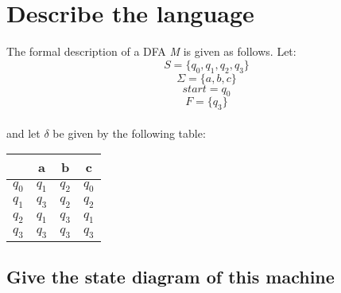 \documentclass[12pt]{article}
\begin{document}
            \pagebreak 

        \section{Describe the language}
            The formal description of a DFA \emph{M} is given as follows. 
            Let: \[S = \{q_0, q_1, q_2, q_3\}\]
                \[\Sigma = \{a, b, c\}\]
                \[start = q_0\]
                \[F= \{q_3\}\]
            \\ and let $\delta$ be given by the following table:
                \begin{center}
                    \begin{tabular}{ c |c c c}
                         & a & b & c \\ 

                        \hline

                        $q_0$ & $q_1$ & $q_2$ & $q_0$ \\ 
                        $q_1$ & $q_3$ & $q_2$ & $q_2$ \\
                        $q_2$ & $q_1$ & $q_3$ & $q_1$ \\
                        $q_3$ & $q_3$ & $q_3$ & $q_3$ \\  
                    \end{tabular}
                \end{center}
                
            \subsection{Give the state diagram of this machine}
                
\end{document}
